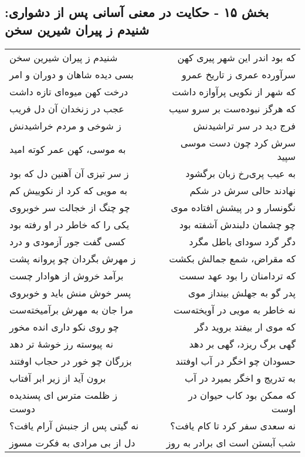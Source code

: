 \begin{center}
\section*{بخش ۱۵ - حکایت در معنی آسانی پس از دشواری: شنیدم ز پیران شیرین سخن}
\label{sec:015}
\begin{longtable}{l p{0.5cm} r}
شنیدم ز پیران شیرین سخن
&&
که بود اندر این شهر پیری کهن
\\
بسی دیده شاهان و دوران و امر
&&
سرآورده عمری ز تاریخ عمرو
\\
درخت کهن میوه‌ای تازه داشت
&&
که شهر از نکویی پرآوازه داشت
\\
عجب در زنخدان آن دل فریب
&&
که هرگز نبوده‌ست بر سرو سیب
\\
ز شوخی و مردم خراشیدنش
&&
فرج دید در سر تراشیدنش
\\
به موسی، کهن عمر کوته امید
&&
سرش کرد چون دست موسی سپید
\\
ز سر تیزی آن آهنین دل که بود
&&
به عیب پری‌رخ زبان برگشود
\\
به مویی که کرد از نکوییش کم
&&
نهادند حالی سرش در شکم
\\
چو چنگ از خجالت سر خوبروی
&&
نگونسار و در پیشش افتاده موی
\\
یکی را که خاطر در او رفته بود
&&
چو چشمان دلبندش آشفته بود
\\
کسی گفت جور آزمودی و درد
&&
دگر گرد سودای باطل مگرد
\\
ز مهرش بگردان چو پروانه پشت
&&
که مقراض، شمع جمالش بکشت
\\
برآمد خروش از هوادار چست
&&
که تردامنان را بود عهد سست
\\
پسر خوش منش باید و خوبروی
&&
پدر گو به جهلش بینداز موی
\\
مرا جان به مهرش برآمیخته‌ست
&&
نه خاطر به مویی در آویخته‌ست
\\
چو روی نکو داری انده مخور
&&
که موی ار بیفتد بروید دگر
\\
نه پیوسته رز خوشهٔ تر دهد
&&
گهی برگ ریزد، گهی بر دهد
\\
بزرگان چو خور در حجاب اوفتند
&&
حسودان چو اخگر در آب اوفتند
\\
برون آید از زیر ابر آفتاب
&&
به تدریج و اخگر بمیرد در آب
\\
ز ظلمت مترس ای پسندیده دوست
&&
که ممکن بود کاب حیوان در اوست
\\
نه گیتی پس از جنبش آرام یافت؟
&&
نه سعدی سفر کرد تا کام یافت؟
\\
دل از بی مرادی به فکرت مسوز
&&
شب آبستن است ای برادر به روز
\\
\end{longtable}
\end{center}
